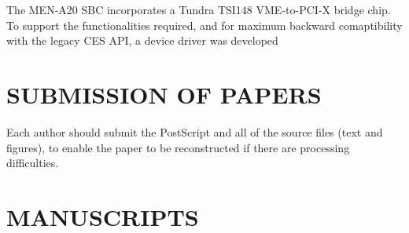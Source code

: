 \documentclass{JAC2003}
\begin{document}
The MEN-A20 SBC incorporates a Tundra TSI148 VME-to-PCI-X bridge chip.
To support the functionalities required, and for maximum backward
comaptibility with the legacy CES API, a device driver was developed 

\section{SUBMISSION OF PAPERS}

Each author should submit the PostScript and all of the source files (text and figures), 
to enable the paper to be reconstructed if there are processing difficulties.

\section{MANUSCRIPTS}
\end{document}
